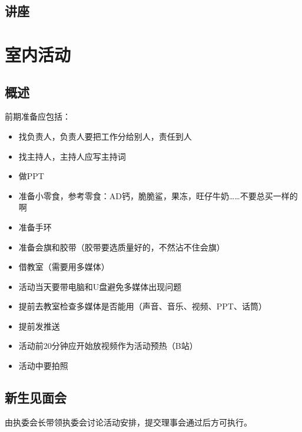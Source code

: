 \documentclass{ctexbook}
\begin{document}
\subsection{讲座}
\section{室内活动}
\subsection{概述}

前期准备应包括：
\begin{itemize}
\item 找负责人，负责人要把工作分给别人，责任到人
\item 找主持人，主持人应写主持词
\item 做PPT
\item 准备小零食，参考零食：AD钙，脆脆鲨，果冻，旺仔牛奶……不要总买一样的啊
\item 准备手环
\item 准备会旗和胶带（胶带要选质量好的，不然沾不住会旗）
\item 借教室（需要用多媒体）
\item 活动当天要带电脑和U盘避免多媒体出现问题
\item 提前去教室检查多媒体是否能用（声音、音乐、视频、PPT、话筒）
\item 提前发推送
\item 活动前20分钟应开始放视频作为活动预热（B站）
\item 活动中要拍照
\end{itemize}
\subsection{新生见面会}
由执委会长带领执委会讨论活动安排，提交理事会通过后方可执行。
\end{document}
